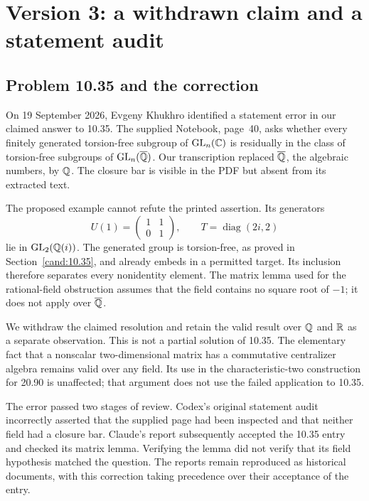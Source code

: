 \clearpage
\section{Version 3: a withdrawn claim and a statement audit}
\label{app:statement-correction}

\subsection{Problem 10.35 and the correction}

On 19 September 2026, Evgeny Khukhro identified a statement error in
our claimed answer to 10.35. The supplied Notebook, page~40, asks whether
every finitely generated torsion-free subgroup of \(\operatorname{GL}_n(\mathbb C)\) is
residually in the class of torsion-free subgroups of
\(\operatorname{GL}_n(\overline{\mathbb Q})\). Our transcription replaced
\(\overline{\mathbb Q}\), the algebraic numbers, by \(\mathbb Q\).
The closure bar is visible in the PDF but absent from its extracted text.

The proposed example cannot refute the printed assertion. Its generators
\[
 U(1)=\begin{pmatrix}1&1\\0&1\end{pmatrix},\qquad
 T=\operatorname{diag}(2i,2)
\]
lie in \(\operatorname{GL}_2(\mathbb Q(i))\). The generated group is torsion-free,
as proved in Section~\ref{cand:10.35}, and already embeds in a permitted
target. Its inclusion therefore separates every nonidentity element.
The matrix lemma used for the rational-field obstruction assumes that
the field contains no square root of \(-1\); it does not apply over
\(\overline{\mathbb Q}\).

We withdraw the claimed resolution and retain the valid result over
\(\mathbb Q\) and \(\mathbb R\) as a separate observation. This is not a partial
solution of 10.35. The elementary fact that a nonscalar two-dimensional
matrix has a commutative centralizer algebra remains valid over any
field. Its use in the characteristic-two construction for 20.90 is
unaffected; that argument does not use the failed application to 10.35.

The error passed two stages of review. Codex's original statement audit
incorrectly asserted that the supplied page had been inspected and that
neither field had a closure bar. Claude's report subsequently accepted
the 10.35 entry and checked its matrix lemma. Verifying the lemma did
not verify that its field hypothesis matched the question. The reports
remain reproduced as historical documents, with this correction taking
precedence over their acceptance of the entry.

